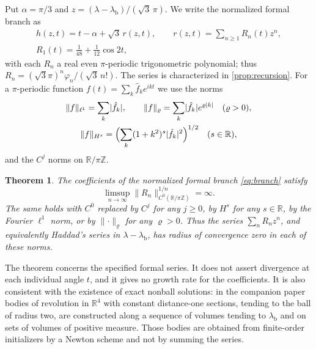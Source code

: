 \documentclass[11pt]{amsart}
\numberwithin{equation}{section}
\newtheorem{theorem}{Theorem}[section]
\theoremstyle{definition}
\theoremstyle{remark}
\newcommand{\R}{\mathbb{R}}
\newcommand{\Z}{\mathbb{Z}}
\newcommand{\abs}[1]{\lvert #1\rvert}
\newcommand{\norm}[1]{\lVert #1\rVert}
\newcommand{\lb}{\lambda_{\mathrm b}}
\begin{document}
Put $\alpha=\pi/3$ and $z=(\lambda-\lb)/(\sqrt3\,\pi)$. We write the normalized formal branch as
\begin{equation}\label{eq:branch}
\begin{gathered}
h(z,t)=t-\alpha+\sqrt3\,r(z,t),\qquad r(z,t)=\sum_{n\ge1}R_n(t)z^n,\\
R_1(t)=\tfrac1{48}+\tfrac1{12}\cos2t,
\end{gathered}
\end{equation}
with each $R_n$ a real even $\pi$-periodic trigonometric polynomial; thus $R_n=(\sqrt3\pi)^n\varphi_n/(\sqrt3\,n!)$. The series is characterized in \cref{prop:recursion}. For a $\pi$-periodic function $f(t)=\sum_k\hat f_ke^{ikt}$ we use the norms
\begin{gather*}
\norm f_{\ell^1}=\sum_k\abs{\hat f_k},\qquad \norm f_\varrho=\sum_k\abs{\hat f_k}e^{\varrho\abs k}\quad(\varrho>0),\\
\norm f_{H^s}=\Bigl(\sum_k(1+k^2)^s\abs{\hat f_k}^2\Bigr)^{1/2}\quad(s\in\R),
\end{gather*}
and the $C^j$ norms on $\R/\pi\Z$.

\begin{theorem}\label{thm:main}
The coefficients of the normalized formal branch \eqref{eq:branch} satisfy
\[
\limsup_{n\to\infty}\norm{R_n}_{C^0(\R/\pi\Z)}^{1/n}=\infty .
\]
The same holds with $C^0$ replaced by $C^j$ for any $j\ge0$, by $H^s$ for any $s\in\R$, by the Fourier $\ell^1$ norm, or by $\norm\cdot_\varrho$ for any $\varrho>0$. Thus the series $\sum_nR_nz^n$, and equivalently Haddad's series in $\lambda-\lb$, has radius of convergence zero in each of these norms.
\end{theorem}

The theorem concerns the specified formal series. It does not assert divergence at each individual angle $t$, and it gives no growth rate for the coefficients. It is also consistent with the existence of exact nonball solutions: in the companion paper \cite{KS} bodies of revolution in $\R^4$ with constant distance-one sections, tending to the ball of radius two, are constructed along a sequence of volumes tending to $\lb$ and on sets of volumes of positive measure. Those bodies are obtained from finite-order initializers by a Newton scheme and not by summing the series.
\end{document}
